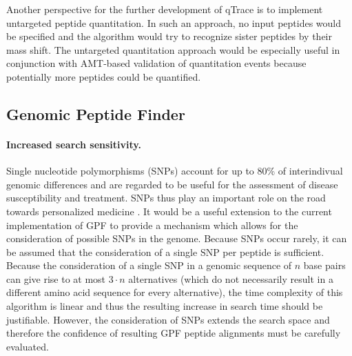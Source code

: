 Another perspective for the further development of qTrace is to implement
untargeted peptide quantitation. 
In such an approach, no input peptides would be specified and the algorithm
would try to recognize sister peptides by their mass shift.
The untargeted quantitation approach would be especially useful in conjunction
with AMT-based validation of quantitation events because potentially more 
peptides could be quantified.

\subsection{Genomic Peptide Finder}

\paragraph{Increased search sensitivity.}

Single nucleotide polymorphisms (SNPs) account for up to 80\% of interindivual
genomic differences and are regarded to be useful for the assessment of disease
susceptibility and treatment.
SNPs thus play an important role on the road towards personalized medicine 
\citep{Carlson2008}.
It would be a useful extension to the current implementation of GPF to provide 
a mechanism which allows for the consideration of possible SNPs in the genome.
Because SNPs occur rarely, it can be assumed that the consideration of a single
SNP per peptide is sufficient.
Because the consideration of a single SNP in a genomic sequence of $n$ base pairs
can give rise to at most $3 \cdot n$ alternatives (which do not necessarily
result in a different amino acid sequence for every alternative), the time 
complexity of this algorithm is linear and thus the resulting increase in 
search time should be justifiable.
However, the consideration of SNPs extends the search space and therefore
the confidence of resulting GPF peptide alignments must be carefully 
evaluated.
